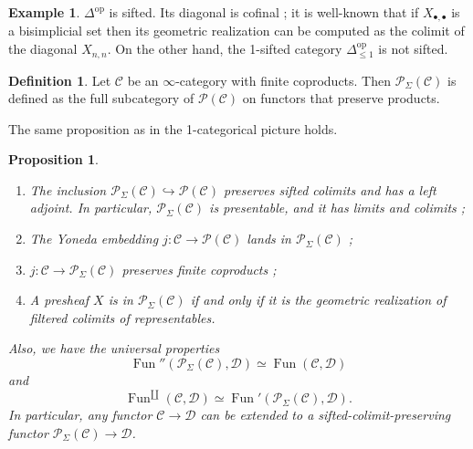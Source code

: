 \documentclass[11pt]{article}
\newtheorem{proposition}{Proposition}
\theoremstyle{definition}
\newtheorem{definition}{Definition}
\newtheorem{example}{Example}
\newcommand{\C}{\mathcal{C}}
\newcommand{\D}{\mathcal{D}}
\newcommand{\Fun}{\operatorname{Fun}}
\newcommand{\op}{\mathrm{op}}
\renewcommand{\P}{\mathcal{P}}
\begin{document}
\begin{example}
    $\Delta^{\op}$ is sifted.
    Its diagonal is cofinal ; it is well-known that if $X_{\bullet, \bullet}$ is a bisimplicial set then its geometric realization can be computed as the colimit of the diagonal $X_{n, n}$.
    On the other hand, the 1-sifted category $\Delta^{\op}_{\leqslant 1}$ is not sifted.
\end{example}

\begin{definition}
    Let $\C$ be an $\infty$-category with finite coproducts.
    Then $\P_{\Sigma}(\C)$ is defined as the full subcategory of $\P(\C)$ on functors that preserve products.
\end{definition}

The same proposition as in the 1-categorical picture holds.
\begin{proposition}
    \begin{enumerate}
        \item The inclusion $\P_{\Sigma}(\C) \hookrightarrow \P(\C)$ preserves sifted colimits and has a left adjoint.
        In particular, $\P_{\Sigma}(\C)$ is presentable, and it has limits and colimits ;
        \item The Yoneda embedding $j : \C \to \P(\C)$ lands in $\P_{\Sigma}(\C)$ ;
        \item $j : \C \to \P_{\Sigma}(\C)$ preserves finite coproducts ;
        \item A presheaf $X$ is in $\P_{\Sigma}(\C)$ if and only if it is the geometric realization of filtered colimits of representables.
    \end{enumerate}
    Also, we have the universal properties
    \[
        \Fun''(\P_{\Sigma}(\C), \D) \simeq \Fun(\C, \D)
    \]
    and
    \[
        \Fun^{\amalg}(\C, \D) \simeq \Fun'(\P_{\Sigma}(\C), \D).
    \]
    In particular, any functor $\C \to \D$ can be extended to a sifted-colimit-preserving functor $\P_{\Sigma}(\C) \to \D$.
\end{proposition}
\end{document}
